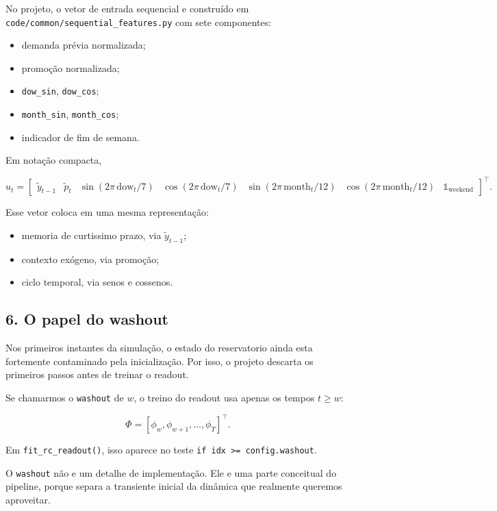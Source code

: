 \documentclass[12pt]{article}
\providecommand{\tightlist}{%
          \setlength{\itemsep}{0pt}\setlength{\parskip}{0pt}}
\begin{document}
No projeto, o vetor de entrada sequencial e construído em \texttt{code/common/sequential\_features.py} com sete componentes:

\begin{itemize}
\tightlist
\item
  demanda prévia normalizada;
\item
  promoção normalizada;
\item
  \texttt{dow\_sin}, \texttt{dow\_cos};
\item
  \texttt{month\_sin}, \texttt{month\_cos};
\item
  indicador de fim de semana.
\end{itemize}

Em notação compacta,

\[
u_t =
\begin{bmatrix}
\widetilde{y}_{t-1} &
\widetilde{p}_t &
\sin(2\pi \, \mathrm{dow}_t / 7) &
\cos(2\pi \, \mathrm{dow}_t / 7) &
\sin(2\pi \, \mathrm{month}_t / 12) &
\cos(2\pi \, \mathrm{month}_t / 12) &
\mathbb{1}_{\mathrm{weekend}}
\end{bmatrix}^\top.
\]

Esse vetor coloca em uma mesma representação:

\begin{itemize}
\tightlist
\item
  memoria de curtissimo prazo, via \(\widetilde{y}_{t-1}\);
\item
  contexto exógeno, via promoção;
\item
  ciclo temporal, via senos e cossenos.
\end{itemize}

\subsection{6. O papel do washout}\label{6-o-papel-do-washout}

Nos primeiros instantes da simulação, o estado do reservatorio ainda esta fortemente contaminado pela inicialização. Por isso, o projeto descarta os primeiros passos antes de treinar o readout.

Se chamarmos o \texttt{washout} de \(w\), o treino do readout usa apenas os tempos \(t \ge w\):

\[
\Phi = [\phi_w, \phi_{w+1}, \dots, \phi_T]^\top.
\]

Em \texttt{fit\_rc\_readout()}, isso aparece no teste \texttt{if\ idx\ \textgreater{}=\ config.washout}.

O \texttt{washout} não e um detalhe de implementação. Ele e uma parte conceitual do pipeline, porque separa a transiente inicial da dinâmica que realmente queremos aproveitar.
\end{document}
